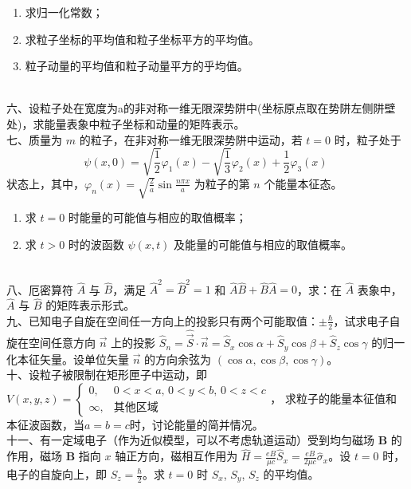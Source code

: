 \begin{enumerate}
    \item 求归一化常数；
    \item 求粒子坐标的平均值和粒子坐标平方的平均值。
    \item 粒子动量的平均值和粒子动量平方的乎均值。
\end{enumerate}\\
六、设粒子处在宽度为a的非对称一维无限深势阱中(坐标原点取在势阱左侧阱壁处)，求能量表象中粒子坐标和动量的矩阵表示。\\
七、质量为 $m$ 的粒子，在非对称一维无限深势阱中运动，若 $t=0$ 时，粒子处于
\[
\psi(x,0) = \sqrt{\frac{1}{2}} \varphi_1(x) - \sqrt{\frac{1}{3}} \varphi_2(x) + \frac{1}{2} \varphi_3(x)~
\]
状态上，其中，$\varphi_n(x) = \sqrt{\frac{2}{a}} \sin \frac{n\pi x}{a}$ 为粒子的第 $n$ 个能量本征态。

\begin{enumerate}
    \item 求 $t=0$ 时能量的可能值与相应的取值概率；
    \item 求 $t>0$ 时的波函数 $\psi(x,t)$ 及能量的可能值与相应的取值概率。
\end{enumerate}\\
八、厄密算符 $\hat{A}$ 与 $\hat{B}$，满足 $\hat{A}^2 = \hat{B}^2 = 1$ 和 $\hat{A}\hat{B} + \hat{B}\hat{A} = 0$，求：在 $\hat{A}$ 表象中，$\hat{A}$ 与 $\hat{B}$ 的矩阵表示形式。\\
九、已知电子自旋在空间任一方向上的投影只有两个可能取值：$\pm \frac{\hbar}{2}$，试求电子自旋在空间任意方向 $\vec{n}$ 上的投影 $\hat S_n = \hat{\vec{S}} \cdot \vec{n} =\hat S_x \cos \alpha + \hat S_y \cos \beta + \hat S_z \cos \gamma$ 的归一化本征矢量。设单位矢量 $\vec{n}$ 的方向余弦为 $(\cos \alpha, \cos \beta, \cos \gamma)$。\\
十、设粒子被限制在矩形匣子中运动，即 $V(x,y,z) = 
\begin{cases} 
0, & 0 < x < a, \, 0 < y < b, \, 0 < z < c \\
\infty, & \text{其他区域}
\end{cases}$，
求粒子的能量本征值和本征波函数，当$a=b=c$时，讨论能量的简并情况。\\
十一、有一定域电子（作为近似模型，可以不考虑轨道运动）受到均匀磁场 $\mathbf{B}$ 的作用，磁场 $\mathbf{B}$ 指向 $x$ 轴正方向，磁相互作用为 $\hat{H} = \frac{eB}{\mu c} \hat{S}_x = \frac{eB}{2\mu c} \hat{\sigma}_x$。设 $t=0$ 时，电子的自旋向上，即 $S_z = \frac{\hbar}{2}$。求 $t=0$ 时 $S_x$, $S_y$, $S_z$ 的平均值。

